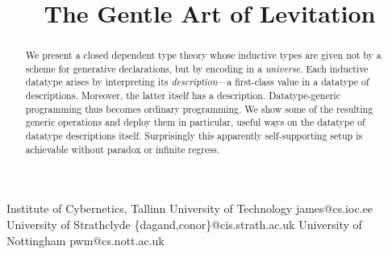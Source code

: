 \documentclass[preprint
              , authoryear
              ]{sigplanconf}
\begin{document}
\ColourEpigram







\title{The Gentle Art of Levitation}


           {Institute of Cybernetics, Tallinn University of Technology}
           {james@cs.ioc.ee}
           {University of Strathclyde}
           {\{dagand,conor\}@cis.strath.ac.uk}
           {University of Nottingham}
           {pwm@cs.nott.ac.uk}


\maketitle




\begin{abstract}
  We present a closed dependent type theory whose inductive types
  are given not by a scheme for generative declarations,
  but by encoding in a \emph{universe}. Each inductive datatype arises
  by interpreting its \emph{description}---a
  first-class value in a datatype of descriptions. Moreover, the
  latter itself has a description. Datatype-generic programming thus
  becomes ordinary programming. We show some of the resulting generic
  operations and deploy them in particular, useful ways on the
  datatype of datatype descriptions itself. Surprisingly this
  apparently self-supporting setup is achievable without paradox or
  infinite regress.
\end{abstract}



\end{document}
